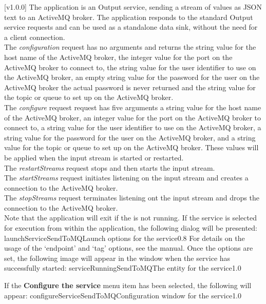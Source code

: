 [v1.0.0]
The  application is an Output service, sending a stream
of \yarp{} values as JSON text to an ActiveMQ broker.
The application responds to the standard Output service requests and can be used as a
standalone data sink, without the need for a client connection.\\

The \emph{configuration} request has no arguments and returns the string value for the
host name of the ActiveMQ broker, the integer value for the port on the ActiveMQ broker to
connect to, the string value for the user identifier to use on the ActiveMQ broker, an
empty string value for the password for the user on the ActiveMQ broker \longDash{} the
actual password is never returned \longDash{} and the string value for the topic or queue
to set up on the ActiveMQ broker.\\

The \emph{configure} request request has five arguments \longDash{} a string value for the
host name of the ActiveMQ broker, an integer value for the port on the ActiveMQ broker to
connect to, a string value for the user identifier to use on the ActiveMQ broker, a string
value for the password for the user on the ActiveMQ broker, and a string value for the
topic or queue to set up on the ActiveMQ broker.
These values will be applied when the input stream is started or restarted.\\

The \emph{restartStreams} request stops and then starts the input stream.\\

The \emph{startStreams} request initiates listening on the input stream and creates a
connection to the ActiveMQ broker.\\

The \emph{stopStreams} request terminates listening ont the input stream and drops the
connection to the ActiveMQ broker.\\ 

Note that the application will exit if the \emph{\RS} is not running.
\insertAppParameters
\insertTagDescription{\SMO}
\insertInputServiceComment
\condPage
\insertStandardServiceCommands
\secondaryEnd
{}
If the service is selected for execution from within the \emph{\MMMU} application, the
following dialog will be presented:
%
{launchServiceSendToMQ}{Launch options for the \emph{\SMO} service}{0.8}
\condPage{}
For details on the usage of the `endpoint' and `tag' options, see the \emph{\MMMU} manual.
Once the options are set, the following image will appear in the \emph{\MMMU} window when
the service has successfully started:
%
{serviceRunningSendToMQ}{The \emph{\MMMU} entity for the \emph{\SMO} service}{1.0}

If the \textbf{Configure the service} menu item has been selected, the following will
appear:
%
{configureServiceSendToMQ}{Configuration window for the \emph{\SMO} service}{1.0}
\secondaryEnd
\primaryEnd{}
